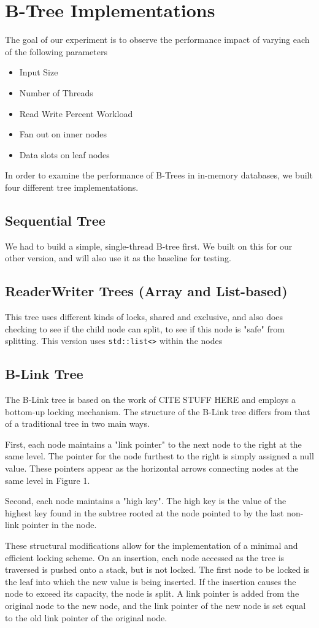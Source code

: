 \documentclass{sig-alternate}
\begin{document}
\section{B-Tree Implementations}
The goal of our experiment is to observe the performance impact of varying each of the following parameters 
\begin{itemize}
  \item Input Size
  \item Number of Threads
  \item Read Write Percent Workload
  \item Fan out on inner nodes
  \item Data slots on leaf nodes
\end{itemize}
In order to examine the performance of B-Trees in in-memory databases, we built four different tree implementations.
\subsection{Sequential Tree}
We had to build a simple, single-thread B-tree first.  We built on this for our other version, and will also use it as the baseline for testing.
\subsection{ReaderWriter Trees (Array and List-based)}
This tree uses different kinds of locks, shared and exclusive, and also does checking to see if the child node can split, to see if this node is "safe" from splitting.  This version uses \texttt{std::list<>} within the nodes
\subsection{B-Link Tree}
The B-Link tree is based on the work of CITE STUFF HERE and employs a bottom-up locking mechanism. The structure of the B-Link tree differs from that of a traditional tree in two main ways.

First, each node maintains a "link pointer" to the next node to the right at the same level. The pointer for the node furthest to the right is simply assigned a null value. These pointers appear as the horizontal arrows connecting nodes at the same level in Figure 1.

Second, each node maintains a "high key". The high key is the value of the highest key found in the subtree rooted at the node pointed to by the last non-link pointer in the node.

These structural modifications allow for the implementation of a minimal and efficient locking scheme. On an insertion, each node accessed as the tree is traversed is pushed onto a stack, but is not locked. The first node to be locked is the leaf into which the new value is being inserted. If the insertion causes the node to exceed its capacity, the node is split. A link pointer is added from the original node to the new node, and the link pointer of the new node is set equal to the old link pointer of the original node.
\end{document}
